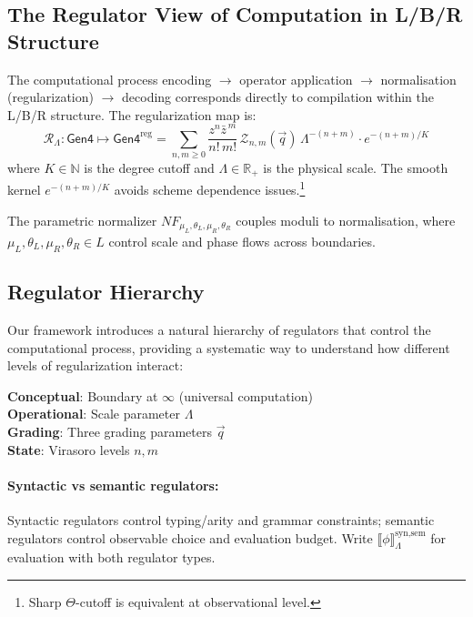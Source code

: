 \subsection{The Regulator View of Computation in L/B/R Structure}

The computational process encoding $\to$ operator application $\to$ normalisation (regularization) $\to$ decoding corresponds directly to compilation within the L/B/R structure. The regularization map is:
\[
\mathcal{R}_\Lambda: \mathsf{Gen4} \mapsto \mathsf{Gen4}^{\text{reg}} = \sum_{n,m\ge0}\frac{z^n\bar{z}^{\,m}}{n!\,m!}\,\mathcal{Z}_{n,m}(\vec{q})\,\Lambda^{-(n+m)} \cdot e^{-(n+m)/K}
\]
where $K \in \mathbb{N}$ is the degree cutoff and $\Lambda \in \mathbb{R}_+$ is the physical scale. The smooth kernel $e^{-(n+m)/K}$ avoids scheme dependence issues.\footnote{Sharp $\Theta$-cutoff is equivalent at observational level.}

The parametric normalizer $NF_{\mu_L,\theta_L,\mu_R,\theta_R}$ couples moduli to normalisation, where $\mu_L, \theta_L, \mu_R, \theta_R \in L$ control scale and phase flows across boundaries.

\subsection{Regulator Hierarchy}

Our framework introduces a natural hierarchy of regulators that control the computational process, providing a systematic way to understand how different levels of regularization interact:

\begin{definition}
\label{def:regulator-hierarchy}
\textbf{Conceptual}: Boundary at $\infty$ (universal computation) \\
\textbf{Operational}: Scale parameter $\Lambda$ \\
\textbf{Grading}: Three grading parameters $\vec{q}$ \\
\textbf{State}: Virasoro levels $n, m$
\end{definition}

\paragraph{Syntactic vs semantic regulators:} Syntactic regulators control typing/arity and grammar constraints; semantic regulators control observable choice and evaluation budget. Write $\llbracket\phi\rrbracket_{\Lambda}^{\text{syn},\text{sem}}$ for evaluation with both regulator types.

